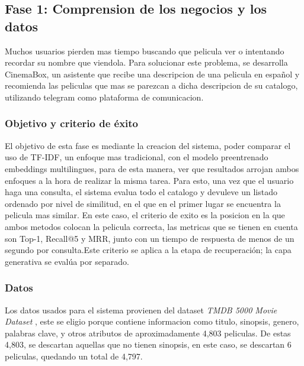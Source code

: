 ﻿\subsection{Fase 1: Comprension de los negocios y los datos}

Muchos usuarios pierden mas tiempo buscando que pelicula ver o intentando recordar su nombre que viendola.
Para solucionar este problema, se desarrolla CinemaBox, un asistente que recibe una descripcion de una pelicula en español y recomienda las peliculas que mas se parezcan a dicha descripcion de su catalogo, utilizando telegram como plataforma de comunicacion.


\subsubsection{Objetivo y criterio de éxito}

El objetivo de esta fase es mediante la creacion del sistema, poder comparar el uso de TF-IDF, un enfoque mas tradicional, con el modelo preentrenado embeddings multilingues, para de esta manera, ver que resultados arrojan ambos enfoques a la hora de realizar la misma tarea. Para esto, una vez que el usuario haga una consulta, el sistema evalua todo el catalogo y devuleve un listado ordenado por nivel de similitud, en el que en el primer lugar se encuentra la pelicula mas similar. En este caso, el criterio de exito es la posicion en la que ambos metodos colocan la pelicula correcta, las metricas que se tienen en cuenta son Top-1, Recall@5 y MRR, junto con un tiempo de respuesta de menos de un segundo por consulta.Este criterio se aplica a la etapa de recuperación; la capa generativa se evalúa por separado.

\subsubsection{Datos}

Los datos usados para el sistema provienen del dataset \textit{TMDB 5000 Movie Dataset} \cite{tmdb5000}, este se eligio porque contiene informacion como titulo, sinopsis, genero, palabras clave, y otros atributos de aproximadamente 4,803 peliculas. De estas 4,803, se descartan aquellas que no tienen sinopsis, en este caso, se descartan 6 peliculas, quedando un total de 4,797.

